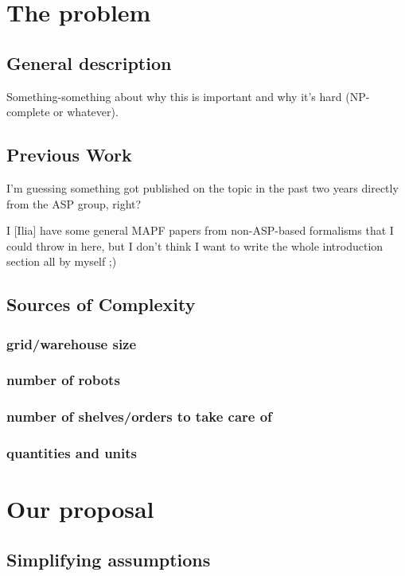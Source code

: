 \documentclass[11pt]{article}
\author{Ilia Kurenkov}
\date{\today}
\title{}
\begin{document}
\tableofcontents

\section{The problem}
\label{sec:org5afa23a}
\subsection{General description}
\label{sec:org0d65846}
Something-something about why this is important and why it's hard (NP-complete or whatever).
\subsection{Previous Work}
\label{sec:org8d0a747}
I'm guessing something got published on the topic in the past two years directly from the ASP group, right?

I [Ilia] have some general MAPF papers from non-ASP-based formalisms that I could throw in here, but I don't think I want to write the whole introduction section all by myself ;)
\subsection{Sources of Complexity}
\label{sec:org4b16dab}
\subsubsection{grid/warehouse size}
\label{sec:org031b74c}
\subsubsection{number of robots}
\label{sec:org4987e85}
\subsubsection{number of shelves/orders to take care of}
\label{sec:org306ac3c}
\subsubsection{quantities and units}
\label{sec:org40c2df1}

\section{Our proposal}
\label{sec:orgdd7d99b}
\subsection{Simplifying assumptions}
\label{sec:orgc9f41e0}
\end{document}
